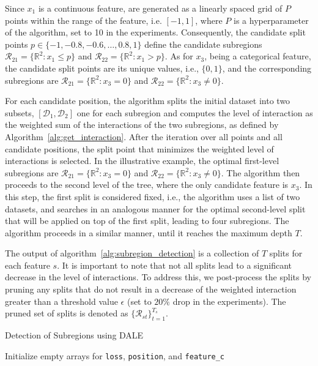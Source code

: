 \documentclass[12pt]{article}
\begin{document}
Since $x_1$ is a continuous feature, are generated as a linearly spaced grid of $P$ points within the range of the feature, i.e. $[-1, 1]$,
where $P$ is a hyperparameter of the algorithm, set to 10 in the experiments.
Consequently, the candidate split points $p \in \{-1, -0.8, -0.6, \ldots, 0.8, 1\}$ define the candidate subregions
$\mathcal{R}_{21} = \{ \mathbb{R}^2 : x_1 \leq p \}$ and $\mathcal{R}_{22} = \{ \mathbb{R}^2 : x_1 > p \}$.
As for $x_3$, being a categorical feature, the candidate split points are its unique values, i.e., $\{0, 1\}$,
and the corresponding subregions are $\mathcal{R}_{21} = \{ \mathbb{R}^2 : x_3 = 0 \}$ and $\mathcal{R}_{22} = \{ \mathbb{R}^2 : x_3 \neq 0 \}$.

For each candidate position, the algorithm splits the initial dataset into two subsets,
$[\mathcal{D}_1, \mathcal{D}_2]$ one for each subregion and computes the level of interaction
as the weighted sum of the interactions of the two subregions, as defined by Algorithm~\ref{alg:get_interaction}.
After the iteration over all points and all candidate positions,
the split point that minimizes the weighted level of interactions is selected.
In the illustrative example, the optimal first-level subregions are
$\mathcal{R}_{21} = \{ \mathbb{R}^2 : x_3 = 0 \}$ and $\mathcal{R}_{22} = \{ \mathbb{R}^2 : x_3 \neq 0 \}$.
The algorithm then proceeds to the second level of the tree, where the only candidate feature is $x_3$.
In this step, the first split is considered fixed, i.e., the algorithm uses a list of two datasets,
and searches in an analogous manner for the optimal second-level split that will be applied on top of the first split,
leading to four subregions.
The algorithm proceeds in a similar manner, until it reaches the maximum depth $T$.

The output of algorithm~\ref{alg:subregion_detection} is a collection of $T$ splits for each feature $s$.
It is important to note that not all splits lead to a significant decrease in the level of interactions.
To address this, we post-process the splits by pruning any splits that do not result in a decrease of the
weighted interaction greater than a threshold value $\epsilon$ (set to $20\%$ drop in the experiments).
The pruned set of splits is denoted as $\{\mathcal{R}_{st}\}_{t=1}^{T_s}$.


\begin{algorithm}
\caption{Detection of Subregions using DALE}
\label{alg:subregion_detection}
\SetAlgoLined
{}
\BlankLine
{}
\BlankLine
{}
\BlankLine
Initialize empty arrays for \texttt{loss}, \texttt{position}, and \texttt{feature\_c}
\BlankLine
{}
\end{algorithm}
\end{document}
